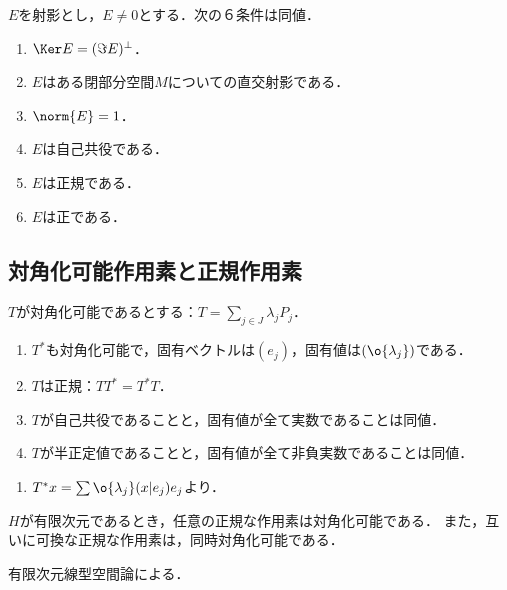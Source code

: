 \documentclass[uplatex,dvipdfmx]{jsreport}
\begin{document}
\begin{lemma}[直交射影の特徴付け]
    $E$を射影とし，$E\ne 0$とする．次の６条件は同値．
    \begin{enumerate}
        \item $\Ker E=(\Im E)^\perp$．
        \item $E$はある閉部分空間$M$についての直交射影である．
        \item $\norm{E}=1$．
        \item $E$は自己共役である．
        \item $E$は正規である．
        \item $E$は正である．
    \end{enumerate}
\end{lemma}

\subsection{対角化可能作用素と正規作用素}

\begin{lemma}[対角化可能作用素の性質]
    $T$が対角化可能であるとする：$T=\sum_{j\in J}\lambda_jP_j$．
    \begin{enumerate}
        \item $T^*$も対角化可能で，固有ベクトルは$(e_j)$，固有値は$(\o{\lambda_j})$である．
        \item $T$は正規：$TT^*=T^*T$．
        \item $T$が自己共役であることと，固有値が全て実数であることは同値．
        \item $T$が半正定値であることと，固有値が全て非負実数であることは同値．
    \end{enumerate}
\end{lemma}
\begin{Proof}\mbox{}
    \begin{enumerate}
        \item $T^*x=\sum\o{\lambda_j}(x|e_j)e_j$より．
    \end{enumerate}
\end{Proof}

\begin{proposition}[有限次元線型空間論]
    $H$が有限次元であるとき，任意の正規な作用素は対角化可能である．
    また，互いに可換な正規な作用素は，同時対角化可能である．
\end{proposition}
\begin{Proof}
    有限次元線型空間論による．
\end{Proof}
\end{document}
